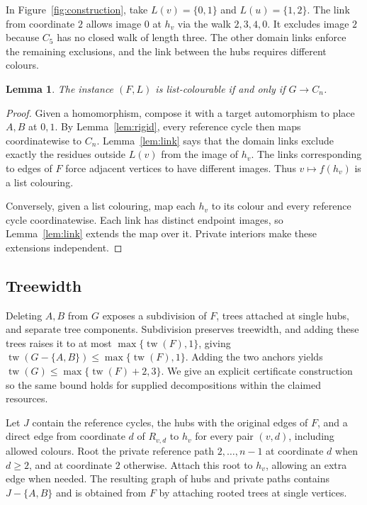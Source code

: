 \documentclass[11pt]{article}
\newtheorem{lemma}[theorem]{Lemma}
\theoremstyle{remark}
\DeclareMathOperator{\tw}{tw}
\begin{document}
In Figure~\ref{fig:construction}, take $L(v)=\{0,1\}$ and $L(u)=\{1,2\}$.
The link from coordinate $2$ allows image $0$ at $h_v$ via the walk
$2,3,4,0$. It excludes image $2$ because $C_5$ has no closed walk of length
three. The other domain links enforce the remaining exclusions, and the
link between the hubs requires different colours.

\par\medskip\noindent\begin{minipage}{\linewidth}
\begin{lemma}\label{lem:equivalence}
The instance $(F,L)$ is list-colourable if and only if $G\to C_n$.
\end{lemma}
\begin{proof}
Given a homomorphism, compose it with a target automorphism to place $A,B$
at $0,1$. By Lemma~\ref{lem:rigid}, every reference cycle then maps
coordinatewise to $C_n$. Lemma~\ref{lem:link} says that the domain links
exclude exactly the residues outside $L(v)$ from the image of $h_v$.
The links corresponding to edges of $F$ force adjacent vertices to have
different images. Thus $v\mapsto f(h_v)$ is a list colouring.

Conversely, given a list colouring, map each $h_v$ to its colour and every
reference cycle coordinatewise. Each link has distinct endpoint images,
so Lemma~\ref{lem:link} extends the map over it. Private interiors make
these extensions independent.
\end{proof}
\end{minipage}\par

\subsection{Treewidth}\label{sec:treewidth}
Deleting $A,B$ from $G$ exposes a subdivision of $F$, trees attached
at single hubs, and separate tree components. Subdivision preserves treewidth,
and adding these trees raises it to at most $\max\{\tw(F),1\}$, giving
$\tw(G-\{A,B\})\leq\max\{\tw(F),1\}$. Adding the two anchors yields
$\tw(G)\leq\max\{\tw(F)+2,3\}$. We give an explicit certificate construction
so the same bound holds for supplied decompositions within the claimed resources.

Let $J$ contain the reference cycles, the hubs with the original edges of
$F$, and a direct edge from coordinate $d$ of $R_{v,d}$ to $h_v$ for every
pair $(v,d)$, including allowed colours. Root the private reference path
$2,\ldots,n-1$ at coordinate $d$ when $d\geq2$, and at coordinate $2$
otherwise. Attach this root to $h_v$, allowing an extra edge when needed.
The resulting graph of hubs and private paths contains $J-\{A,B\}$ and
is obtained from $F$ by attaching rooted trees at single vertices.
\end{document}
